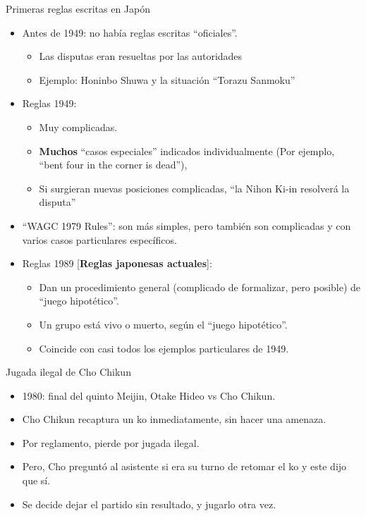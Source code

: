 \documentclass{beamer}
\begin{document}
\begin{frame}{Primeras reglas escritas en Japón}
  
  \begin{itemize}
    \item Antes de 1949: no había reglas escritas ``oficiales''. 
       \begin{itemize}
         \item Las disputas eran resueltas por las autoridades
         \item Ejemplo: Honinbo Shuwa y la situación ``Torazu Sanmoku''
       \end{itemize}
    \item Reglas 1949: 
    \begin{itemize}
        \item Muy complicadas.
        \item \textbf{Muchos} ``casos especiales'' indicados individualmente (Por ejemplo, ``bent four in the corner is dead''),
        \item Si surgieran nuevas posiciones complicadas, ``la Nihon Ki-in resolverá la disputa''
    \end{itemize}
    \item ``WAGC 1979 Rules'': son más simples, pero también son complicadas y con varios casos particulares específicos. 
    \item Reglas 1989 [\textbf{Reglas japonesas actuales}]:
     \begin{itemize}
        \item Dan un procedimiento general (complicado de formalizar, pero posible) de ``juego hipotético''.
        \item Un grupo está vivo o muerto, según el ``juego hipotético''.
        \item Coincide con casi todos los ejemplos particulares de 1949.
     \end{itemize} 
    
  \end{itemize}
  
\end{frame}

\begin{frame}{Jugada ilegal de Cho Chikun}
  
  \begin{itemize}
    \item 1980: final del quinto Meijin, Otake Hideo vs Cho Chikun.
    \item Cho Chikun recaptura un ko inmediatamente, sin hacer una amenaza.
    \item Por reglamento, pierde por jugada ilegal.
    \item Pero, Cho preguntó al asistente si era su turno de retomar el ko y este dijo que sí.
    \item Se decide dejar el partido sin resultado, y jugarlo otra vez.
    
  \end{itemize}
  
\end{frame}
\end{document}
